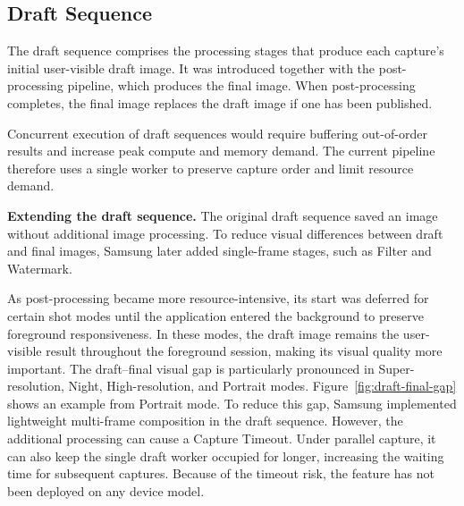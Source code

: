 \subsection{Draft Sequence}
\label{sec:draft-background}

The draft sequence comprises the processing stages that produce each capture's initial user-visible draft image.
It was introduced together with the post-processing pipeline, which produces the final image.
When post-processing completes, the final image replaces the draft image if one has been published.

Concurrent execution of draft sequences would require buffering out-of-order results and increase peak compute and memory demand.
The current pipeline therefore uses a single worker to preserve capture order and limit resource demand.



\smallskip\noindent\textbf{Extending the draft sequence.}
The original draft sequence saved an image without additional image processing.
To reduce visual differences between draft and final images, Samsung later added single-frame stages, such as Filter and Watermark.

As post-processing became more resource-intensive, its start was deferred for certain shot modes until the application entered the background to preserve foreground responsiveness.
In these modes, the draft image remains the user-visible result throughout the foreground session, making its visual quality more important.
The draft--final visual gap is particularly pronounced in Super-resolution, Night, High-resolution, and Portrait modes.
Figure~\ref{fig:draft-final-gap} shows an example from Portrait mode.
To reduce this gap, Samsung implemented lightweight multi-frame composition in the draft sequence.
However, the additional processing can cause a Capture Timeout.
Under parallel capture, it can also keep the single draft worker occupied for longer, increasing the waiting time for subsequent captures.
Because of the timeout risk, the feature has not been deployed on any device model.
